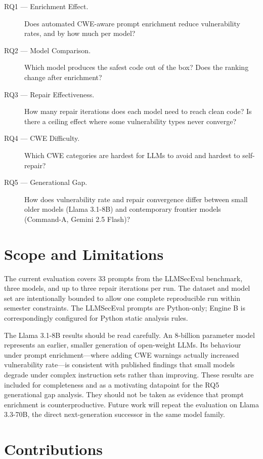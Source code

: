 \documentclass[12pt,a4paper]{report}
\begin{document}
\begin{description}
  \item[RQ1 --- Enrichment Effect.] Does automated CWE-aware prompt enrichment
        reduce vulnerability rates, and by how much per model?
  \item[RQ2 --- Model Comparison.] Which model produces the safest code out of
        the box? Does the ranking change after enrichment?
  \item[RQ3 --- Repair Effectiveness.] How many repair iterations does each model
        need to reach clean code? Is there a ceiling effect where some
        vulnerability types never converge?
  \item[RQ4 --- CWE Difficulty.] Which CWE categories are hardest for LLMs to
        avoid and hardest to self-repair?
  \item[RQ5 --- Generational Gap.] How does vulnerability rate and repair
        convergence differ between small older models (Llama 3.1-8B) and
        contemporary frontier models (Command-A, Gemini 2.5 Flash)?
\end{description}

\section{Scope and Limitations}
\label{sec:scope}

The current evaluation covers 33 prompts from the LLMSecEval benchmark, three
models, and up to three repair iterations per run. The dataset and model set are
intentionally bounded to allow one complete reproducible run within semester
constraints. The LLMSecEval prompts are Python-only; Engine B is correspondingly
configured for Python static analysis rules.

The Llama 3.1-8B results should be read carefully. An 8-billion parameter model
represents an earlier, smaller generation of open-weight LLMs. Its behaviour under
prompt enrichment---where adding CWE warnings actually increased vulnerability
rate---is consistent with published findings that small models degrade under
complex instruction sets rather than improving. These results are included for
completeness and as a motivating datapoint for the RQ5 generational gap analysis.
They should not be taken as evidence that prompt enrichment is counterproductive.
Future work will repeat the evaluation on Llama 3.3-70B, the direct
next-generation successor in the same model family.

\section{Contributions}
\label{sec:contributions}
\end{document}
